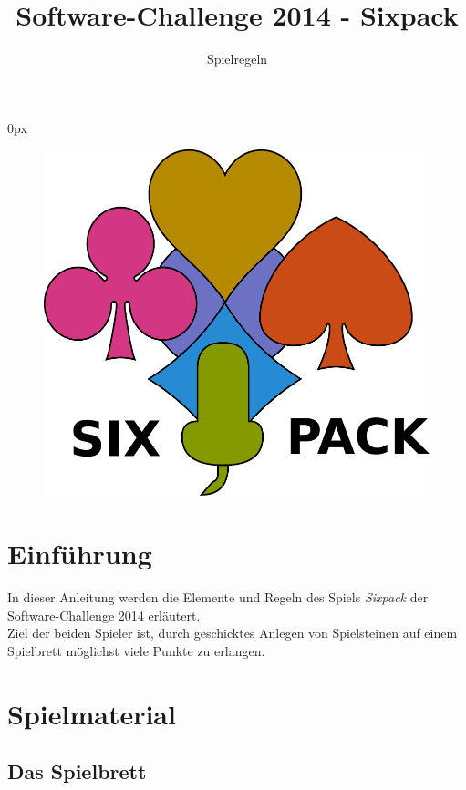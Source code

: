 \documentclass[a4paper, ngerman]{scrartcl}
\title{Software-Challenge 2014 - Sixpack}
\subtitle{Spielregeln}
\begin{document}
\parindent0px
\maketitle

\vspace{0.15\textheight}
\begin{figure}[h]
	\centering
	\includegraphics[scale = 0.5]{images/sixpack_logo.pdf}
\end{figure}
\vspace*{\fill}

\newpage
\tableofcontents
\newpage

\section{Einführung}
In dieser Anleitung werden die Elemente und Regeln des Spiels \emph{Sixpack}
der Software-Challenge 2014 erläutert.\\
Ziel der beiden Spieler ist, durch geschicktes Anlegen von Spielsteinen auf einem Spielbrett möglichst viele Punkte zu erlangen.

\section{Spielmaterial}
\subsection{Das Spielbrett}
\end{document}
